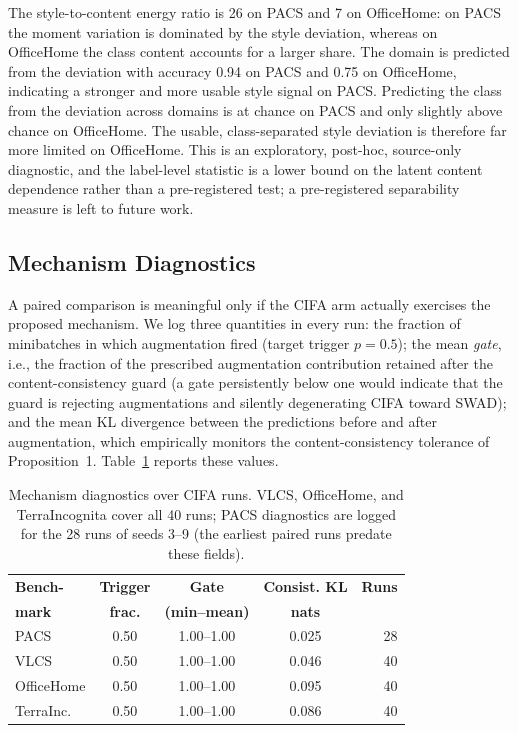 \documentclass[electronics,article,submit,moreauthors]{Definitions/mdpi}
\begin{document}
The style-to-content energy ratio is 26 on PACS and 7 on OfficeHome: on PACS the moment variation is dominated by the style deviation, whereas on OfficeHome the class content accounts for a larger share. The domain is predicted from the deviation with accuracy 0.94 on PACS and 0.75 on OfficeHome, indicating a stronger and more usable style signal on PACS. Predicting the class from the deviation across domains is at chance on PACS and only slightly above chance on OfficeHome. The usable, class-separated style deviation is therefore far more limited on OfficeHome. This is an exploratory, post-hoc, source-only diagnostic, and the label-level statistic is a lower bound on the latent content dependence rather than a pre-registered test; a pre-registered separability measure is left to future work.

\subsection{Mechanism Diagnostics}
\label{sec:mechdiag}

A paired comparison is meaningful only if the CIFA arm actually exercises the proposed mechanism. We log three quantities in every run: the fraction of minibatches in which augmentation fired (target trigger $p=0.5$); the mean \emph{gate}, i.e., the fraction of the prescribed augmentation contribution retained after the content-consistency guard (a gate persistently below one would indicate that the guard is rejecting augmentations and silently degenerating CIFA toward SWAD); and the mean KL divergence between the predictions before and after augmentation, which empirically monitors the content-consistency tolerance of Proposition~1. Table~\ref{tab:diag} reports these values.
\begin{table}[t]
\centering
\caption{Mechanism diagnostics over CIFA runs. VLCS, OfficeHome, and TerraIncognita cover all 40 runs; PACS diagnostics are logged for the 28 runs of seeds 3--9 (the earliest paired runs predate these fields).}
\label{tab:diag}
\setlength{\tabcolsep}{4pt}
\footnotesize
\begin{tabular}{lcccr}
\toprule
\textbf{Bench-} & \textbf{Trigger} & \textbf{Gate} & \textbf{Consist. KL} & \textbf{Runs}\\
\textbf{mark} & \textbf{frac.} & \textbf{(min--mean)} & \textbf{nats} & \\
\midrule
PACS & 0.50 & 1.00--1.00 & 0.025 & 28\\
VLCS & 0.50 & 1.00--1.00 & 0.046 & 40\\
OfficeHome & 0.50 & 1.00--1.00 & 0.095 & 40\\
TerraInc. & 0.50 & 1.00--1.00 & 0.086 & 40\\
\bottomrule
\end{tabular}
\end{table}
\end{document}
